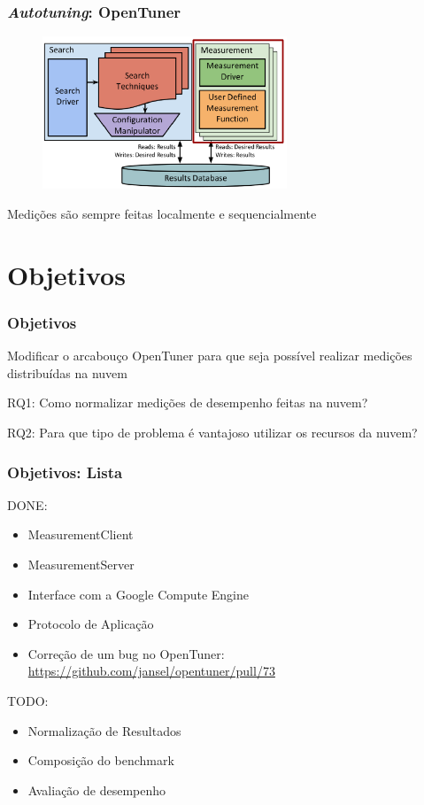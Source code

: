 \documentclass[10pt, compress]{beamer}
\begin{document}
\begin{frame}[fragile]
  \frametitle{\emph{Autotuning}: OpenTuner}
  \begin{figure}[H]
      \includegraphics[width=0.65\textwidth]{opentuner-measurement.png}
  \end{figure}
  Medições são sempre feitas \alert{localmente} e \alert{sequencialmente}
\end{frame}

\section{Objetivos}

\begin{frame}[fragile]
  \frametitle{Objetivos}
  \alert{Modificar} o arcabouço OpenTuner para que seja possível
  realizar medições \alert{distribuídas} na nuvem

  \alert{RQ1}: Como normalizar medições de desempenho feitas na nuvem?

  \alert{RQ2}: Para que tipo de problema é vantajoso utilizar os recursos da nuvem?
\end{frame}

\begin{frame}[fragile]
  \frametitle{Objetivos: Lista}
  \alert{DONE}:
  \begin{itemize}
      \item \alert{MeasurementClient}
      \item \alert{MeasurementServer}
      \item \alert{Interface} com a Google Compute Engine
      \item \alert{Protocolo} de Aplicação
      \item Correção de um \alert{bug} no OpenTuner: 
          \url{https://github.com/jansel/opentuner/pull/73}
  \end{itemize}
  \alert{TODO}:
  \begin{itemize}
      \item \alert{Normalização} de Resultados
      \item Composição do \alert{benchmark}
      \item Avaliação de \alert{desempenho}
  \end{itemize}
\end{frame}
\end{document}
